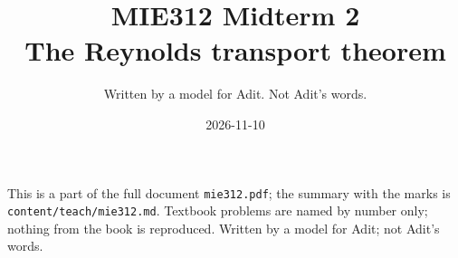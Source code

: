 
\title{MIE312 Midterm 2\\[0.3em]\large The Reynolds transport theorem}
\author{Written by a model for Adit. Not Adit's words.}
\date{2026-11-10}

\maketitle
\begin{sloppypar}\noindent\small This is a part of the full document \texttt{mie312.pdf}; the summary with the marks is \texttt{content/teach/mie312.md}. Textbook problems are named by number only; nothing from the book is reproduced. Written by a model for Adit; not Adit's words.\normalsize\end{sloppypar}



